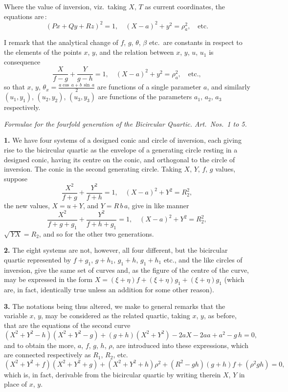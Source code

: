 \documentclass[11pt,a4paper]{book}
\begin{document}
Where the value of inversion, viz.\ taking $X$, $T$ as current coordinates, the equations are\,:
\[
(P x + Q y + R z)^2 = 1, \quad (X - a)^2 + y^2 = \rho_a^2, \quad \text{etc.}
\]

I remark that the analytical change of $f$, $g$, $\theta$, $\beta$ etc.\ are constants in respect to the elements of the points $x$, $y$, and the relation between $x$, $y$, $u$, $u_1$ is consequence
\[
\frac{X}{f - g} + \frac{Y}{g - h} = 1, \quad (X - a)^2 + y^2 = \rho_a^2, \quad \text{etc.},
\]
so that $x$, $y$, $\theta_x = \frac{a\cos\,a + b\,\sin\,a}{2}$ are functions of a single parameter $a$, and similarly $(u_1, y_1)$, $(u_2, y_2)$, $(u_3, y_3)$ are functions of the parameters $a_1$, $a_2$, $a_3$ respectively.

\medskip

\noindent\textit{Formulae for the fourfold generation of the Bicircular Quartic. Art.\ Nos.\ 1 to 5.}

\medskip

\noindent\textbf{1.} We have four systems of a designed conic and circle of inversion, each giving rise to the bicircular quartic as the envelope of a generating circle resting in a designed conic, having its centre on the conic, and orthogonal to the circle of inversion. The conic in the second generating circle. Taking $X$, $Y$, $f$, $g$ values, suppose
\[
\frac{X^2}{f + g} + \frac{Y^2}{f + h} = 1, \quad (X - a)^2 + Y^2 = R_2^2,
\]
the new values, $X = u + Y$, and $Y = R\,b\,a$, give in like manner
\[
\frac{X^2}{f + g + g_1} + \frac{Y^2}{f + h + g_1} = 1, \quad (X - a)^2 + Y^2 = R_2^2,
\]
$\sqrt{\,Y X} = R_2$, and so for the other two generations.

\medskip

\noindent\textbf{2.} The eight systems are not, however, all four different, but the bicircular quartic represented by $f + g_1$, $g + h_1$, $g_1 + h$, $g_1 + h_1$ etc., and the like circles of inversion, give the same set of curves and, as the figure of the centre of the curve, may be expressed in the form $X = (\xi + \eta) f + (\xi + \eta) g_1 + (\xi + \eta) g_1$ (which are, in fact, identically true unless an addition for some other reason).

\medskip

\noindent\textbf{3.} The notations being thus altered, we make to general remarks that the variable $x$, $y$, may be considered as the related quartic, taking $x$, $y$, as before, that are the equations of the second curve
\[
( X^2 + Y^2 - h)(X^2 + Y^2 - g) + (g + h)(X^2 + Y^2) - 2 a X - 2 a a + a^2 - g\,h = 0,
\]
and to obtain the more, $a$, $f$, $g$, $h$, $\rho$, are introduced into these expressions, which are connected respectively as $R_1$, $R_2$, etc.\
\[
( X^2 + Y^2 + f)(X^2 + Y^2 + g) + (X^2 + Y^2 + h)\rho^2 + (R^2 - g h)(g + h) f + (\rho^2 g h) = 0,
\]
which is, in fact, derivable from the bicircular quartic by writing therein $X$, $Y$ in place of $x$, $y$.
\end{document}
